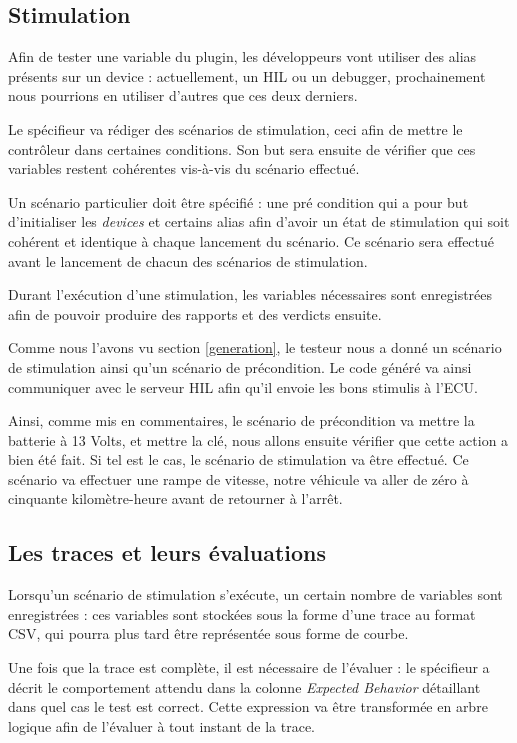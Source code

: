 \subsection{Stimulation} \label{stim}
Afin de tester une variable du plugin, les développeurs vont utiliser des alias présents sur un device : actuellement, un HIL ou un debugger, prochainement nous pourrions en utiliser d'autres que ces deux derniers.

Le spécifieur va rédiger des scénarios de stimulation, ceci afin de mettre le contrôleur dans certaines conditions. Son but sera ensuite de vérifier que ces variables restent cohérentes vis-à-vis du scénario effectué. 

Un scénario particulier doit être spécifié : une pré condition qui a pour but d'initialiser les \textit{devices} et certains alias afin d'avoir un état de stimulation qui soit cohérent et identique à chaque lancement du scénario. Ce scénario sera effectué avant le lancement de chacun des scénarios de stimulation.

Durant l'exécution d'une stimulation, les variables nécessaires sont enregistrées afin de pouvoir produire des rapports et des
verdicts ensuite.
\begin{exemple}
	Comme nous l'avons vu section \ref{generation}, le testeur nous a donné un scénario de stimulation ainsi qu'un scénario de précondition. Le code généré va ainsi communiquer avec le serveur HIL afin qu'il envoie les bons stimulis à l'ECU.

	Ainsi, comme mis en commentaires, le scénario de précondition va mettre la batterie à 13 Volts, et mettre la clé, nous allons ensuite vérifier que cette action a bien été fait. Si tel est le cas, le scénario de stimulation va être effectué. Ce scénario va effectuer une rampe de vitesse, notre véhicule va aller de zéro à cinquante kilomètre-heure avant de retourner à l'arrêt.	
\end{exemple}

\subsection{Les traces et leurs évaluations}\label{expectedBehavior}
Lorsqu'un scénario de stimulation s'exécute, un certain nombre de variables sont enregistrées : ces variables sont stockées sous la forme d'une trace au format CSV, qui pourra plus tard être représentée sous forme de courbe. 

Une fois que la trace est complète, il est nécessaire de l'évaluer : le spécifieur a décrit le comportement attendu dans la colonne \textit{Expected Behavior} détaillant dans quel cas le test est correct. Cette expression va être transformée en arbre logique afin de l'évaluer à tout instant de la trace. 

